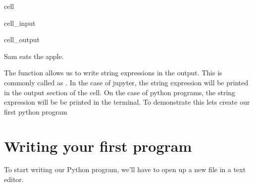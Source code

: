 \documentclass[letterpaper,10pt,english]{jupyterBook}
\begin{document}
\begin{sphinxuseclass}{cell}\begin{sphinxVerbatimInput}

\begin{sphinxuseclass}{cell_input}
\begin{sphinxVerbatim}[commandchars=\\\{\}]
  
  
  

          
\end{sphinxVerbatim}

\end{sphinxuseclass}\end{sphinxVerbatimInput}
\begin{sphinxVerbatimOutput}

\begin{sphinxuseclass}{cell_output}
\begin{sphinxVerbatim}[commandchars=\\\{\}]
Sam eats the apple.
\end{sphinxVerbatim}

\end{sphinxuseclass}\end{sphinxVerbatimOutput}

\end{sphinxuseclass}
\sphinxAtStartPar
The function  allows us to write string expressions in the output. This is commonly called as . In the case of jupyter, the string expression will be printed in the output section of the cell. On the case of python programs, the string expression will be be printed in the terminal. To demonstrate this lets create our first python program


\section{Writing your first program}
\label{\detokenize{first-program:writing-your-first-program}}
\sphinxAtStartPar
To start writing our Python program, we’ll have to open up a new file in a text editor.
\end{document}
